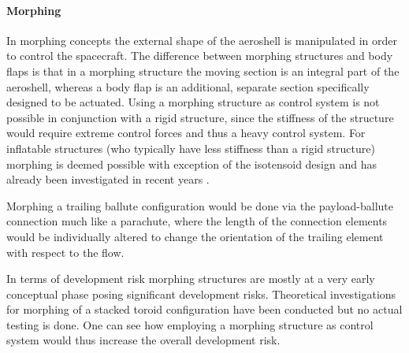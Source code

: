 \paragraph{Morphing}
In morphing concepts the external shape of the aeroshell is manipulated in order to control the spacecraft. The difference between morphing structures and body flaps is that in a morphing structure the moving section is an integral part of the aeroshell, whereas a body flap is an additional, separate section specifically designed to be actuated. Using a morphing structure as control system is not possible in conjunction with a rigid structure, since the stiffness of the structure would require extreme control forces and thus a heavy control system. For inflatable structures (who typically have less stiffness than a rigid structure) morphing is deemed possible with exception of the isotensoid design and has already been investigated in recent years \cite{Hughes2011}.

Morphing a trailing ballute configuration would be done via the payload-ballute connection much like a parachute, where the length of the connection elements would be individually altered to change the orientation of the trailing element with respect to the flow.

In terms of development risk morphing structures are mostly at a very early conceptual phase posing significant development risks. Theoretical investigations for morphing of a stacked toroid configuration have been conducted \cite{Green2013} but no actual testing is done. One can see how employing a morphing structure as control system would thus increase the overall development risk.